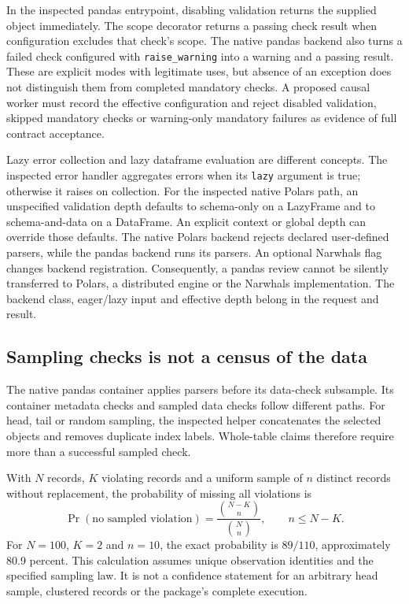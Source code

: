 In the inspected pandas entrypoint, disabling validation returns the supplied
object immediately. The scope decorator returns a passing check result when
configuration excludes that check's scope. The native pandas backend also
turns a failed check configured with \texttt{raise\_warning} into a warning
and a passing result. These are explicit modes with legitimate uses, but
absence of an exception does not distinguish them from completed mandatory
checks. A proposed causal worker must record the effective configuration and
reject disabled validation, skipped mandatory checks or warning-only mandatory
failures as evidence of full contract acceptance.\citep{exec24_pandera_source}

Lazy error collection and lazy dataframe evaluation are different concepts.
The inspected error handler aggregates errors when its \texttt{lazy} argument
is true; otherwise it raises on collection. For the inspected native Polars
path, an unspecified validation depth defaults to schema-only on a LazyFrame
and to schema-and-data on a DataFrame. An explicit context or global depth
can override those defaults. The native Polars backend rejects declared
user-defined parsers, while the pandas backend runs its parsers. An optional
Narwhals flag changes backend registration. Consequently, a pandas review
cannot be silently transferred to Polars, a distributed engine or the
Narwhals implementation. The backend class, eager/lazy input and effective
depth belong in the request and result.\citep{exec24_pandera_source}

\subsection{Sampling checks is not a census of the data}
The native pandas container applies parsers before its data-check subsample.
Its container metadata checks and sampled data checks follow different paths.
For head, tail or random sampling, the inspected helper concatenates the
selected objects and removes duplicate index labels. Whole-table claims
therefore require more than a successful sampled check.
\citep{exec24_pandera_source}

With $N$ records, $K$ violating records and a uniform sample of $n$ distinct
records without replacement, the probability of missing all violations is
\begin{equation}
 \Pr(\text{no sampled violation})=
 \frac{\binom{N-K}{n}}{\binom{N}{n}},\qquad n\leq N-K.
\end{equation}
For $N=100$, $K=2$ and $n=10$, the exact probability is $89/110$, approximately
80.9 percent. This calculation assumes unique observation identities and the
specified sampling law. It is not a confidence statement for an arbitrary
head sample, clustered records or the package's complete execution.
\citep{exec24_pandera_reference}


